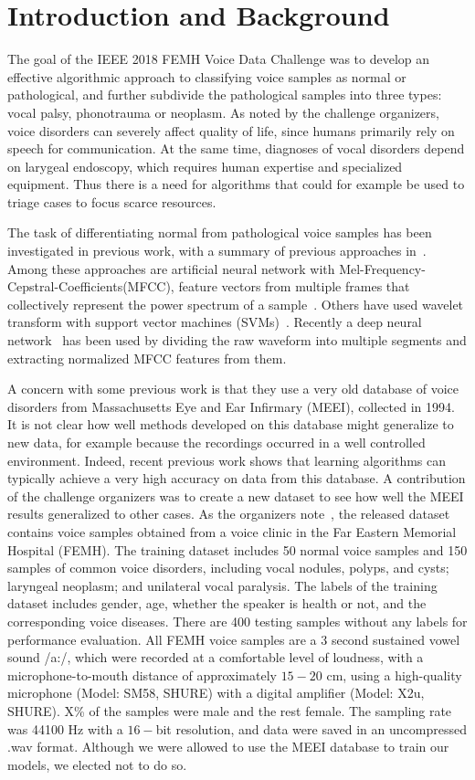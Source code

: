 \section{Introduction and Background}
The goal of the IEEE 2018 FEMH Voice Data Challenge was to develop an effective algorithmic approach to classifying voice samples as normal or pathological, and further subdivide the pathological samples into three types: vocal palsy, phonotrauma or neoplasm. As noted by the challenge organizers, voice disorders can severely affect quality of life, since humans primarily rely on speech for communication. At the same time, diagnoses of vocal disorders depend on larygeal endoscopy, which requires human expertise and specialized equipment. Thus there is a need for algorithms that could for example be used to triage cases to focus scarce resources.

The task of differentiating normal from pathological voice samples has been investigated in previous work, with a summary of previous approaches in~\cite{b9}. Among these approaches are artificial neural network with Mel-Frequency-Cepstral-Coefficients(MFCC), feature vectors from multiple frames that collectively represent the power spectrum of a sample~\cite{b5}. Others have used wavelet transform with support vector machines (SVMs)~\cite{b4}. Recently a deep neural network~\cite{b9} has been used by dividing the raw waveform into multiple segments and extracting normalized MFCC features from them.

A concern with some previous work is that they use a very old database of voice disorders from Massachusetts Eye and Ear Infirmary (MEEI), collected in 1994. It is not clear how well methods developed on this database might generalize to new data, for example because the recordings occurred in a well controlled environment. Indeed, recent previous work shows that learning algorithms can typically achieve a very high accuracy on data from this database. A contribution of the challenge organizers was to create a new dataset to see how well the MEEI results generalized to other cases. As the organizers note~\cite{}, the released dataset contains voice samples obtained from a voice clinic in the Far Eastern Memorial Hospital (FEMH). The training dataset includes 50 normal voice samples and 150 samples of common voice disorders, including vocal nodules, polyps, and cysts; laryngeal neoplasm; and unilateral vocal paralysis. The labels of the training dataset includes gender, age, whether the speaker is health or not, and the corresponding voice diseases. There are 400 testing samples without any labels for performance evaluation. All FEMH voice samples are a 3 second sustained vowel sound /a:/, which were recorded at a comfortable level of loudness, with a microphone-to-mouth distance of approximately $15-20$ cm, using a high-quality microphone (Model: SM58, SHURE) with a digital amplifier (Model: X2u, SHURE). X\% of the samples were male and the rest female. The sampling rate was 44100 Hz with a $16-$bit resolution, and data were saved in an uncompressed .wav format. Although we were allowed to use the MEEI database to train our models, we elected not to do so.

